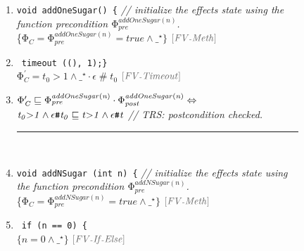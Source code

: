 \documentclass[acmsmall,10pt,review]{acmart}
\newcommand{\siderule}[1]{
\code{\footnotesize{\textcolor{mGray}{#1}}}}
\newcommand{\effect}{{\ensuremath{\mathrm{\Phi}}}}
\newcommand{\anyevent}[1]{{\textcolor{darkred}
{{\textbf{\footnotesize #1}}}}}
\newcommand{\code}[1]{{\tt{\ensuremath{\m{#1}}}}}
\newcommand{\CONTAIN}{\sqsubseteq}
\newcommand{\m}{\mathit}
\newcommand{\mysharp}{{\mathrel{\texttt{\#}}}}
\begin{document}
{
\begin{figure}[!ht]
     \begin{minipage}[c]{\columnwidth}
         \centering
         {%
         \begin{enumerate}
\item \lstinline|void addOneSugar() {| \textcolor{mGray}{\footnotesize 
\quad \emph{// initialize the effects state using the function precondition \code{\effect_{pre}^{addOneSugar(n)}}.}} \\
\textcolor{darklavender}{\{\code{\effect_C {=}\effect_{pre}^{addOneSugar(n)} =  true \wedge  \_^\star \} }} 
\quad \siderule{\scriptsize[FV\text{-}Meth] } \\

\item ~\qquad \lstinline|timeout ((), 1);}| \\
\textcolor{darklavender}{\code{\effect_C^\prime {=} t_0{>}1   \wedge \_^\star \cdot \epsilon \mysharp t_0  }} 
\quad \siderule {\scriptsize [FV\text{-}Timeout]}
\item 
\textcolor{darkred}{\code{
\effect_C^\prime \CONTAIN \effect_{pre}^{addOneSugar(n)} \cdot \effect_{post}^{addOneSugar(n)} \Leftrightarrow  }} 
 \textcolor{darkred}{\code{\code{\code{t_0{>}1   \wedge \epsilon \mysharp t_0}
 \CONTAIN t{>}1   \wedge \epsilon \mysharp t }}}
 \quad \textcolor{mGray}{\footnotesize  \emph{// TRS: postcondition checked. }}
 \\ 
  \noindent\rule{0.92\columnwidth}{0.4pt}
  \vspace{2mm}
~\\
\item \lstinline|void addNSugar (int n) {| \textcolor{mGray}{\footnotesize 
\quad \emph{// initialize the effects state using the function precondition \code{\effect_{pre}^{addNSugar(n)}}.}} \\
     \textcolor{darklavender}{\{\code{\effect_C {=}\effect_{pre}^{addNSugar(n)} =  true \wedge  \_^\star \} }} 
      \quad \siderule{\scriptsize[FV\text{-}Meth] } \\
     \item ~\qquad \lstinline|if (n == 0) {| \\
     \textcolor{darklavender}{\code{\{ n{=}0 \wedge  \_^\star \}  }} 
     \quad \siderule{\scriptsize [FV\text{-}If\text{-}Else]}

\end{enumerate}}
\end{minipage}
\end{figure}}
\end{document}
